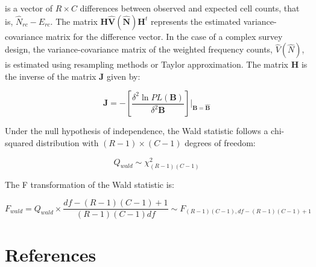 \documentclass[
  12pt,
]{book}
\begin{document}
is a vector of \(R \times C\) differences between observed and expected cell counts, that is, \(\hat{N}_{rc} - E_{rc}\). The matrix \(\boldsymbol{H} \hat{\boldsymbol{V}} \left(\hat{\boldsymbol{N}}\right) \boldsymbol{H}^{t}\) represents the estimated variance-covariance matrix for the difference vector. In the case of a complex survey design, the variance-covariance matrix of the weighted frequency counts, \(\hat{V} \left(\hat{N}\right)\), is estimated using resampling methods or Taylor approximation. The matrix \(\boldsymbol{H}\) is the inverse of the matrix \(\boldsymbol{J}\) given by:

\[
\boldsymbol{J} = -\left[\frac{\delta^{2} \ln PL\left(\boldsymbol{B}\right)}{\delta^{2} \boldsymbol{B}}\right] \bigg|_{\boldsymbol{B} = \hat{\boldsymbol{B}}}
\]

Under the null hypothesis of independence, the Wald statistic follows a chi-squared distribution with \((R-1) \times (C-1)\) degrees of freedom:

\[
Q_{wald} \sim \chi^{2}_{(R-1)(C-1)}
\]

The F transformation of the Wald statistic is:

\[
F_{wald} = Q_{wald} \times \frac{df - (R-1)(C-1) + 1}{(R-1)(C-1) df} \sim F_{(R-1)(C-1), df - (R-1)(C-1) + 1}
\]

\hypertarget{references}{%
\chapter*{References}\label{references}}

  
\end{document}
